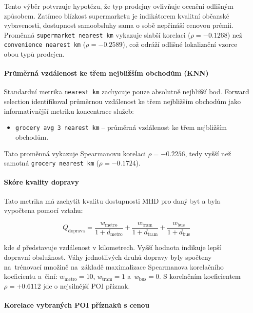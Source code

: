 Tento výběr potvrzuje hypotézu, že typ prodejny ovlivňuje ocenění odlišným způsobem. Zatímco blízkost supermarketu je indikátorem kvalitní občanské vybavenosti, dostupnost samoobsluhy sama o sobě nepřináší cenovou prémii. Proměnná \texttt{supermarket nearest km} vykazuje slabší korelaci (\(\rho = -0.1268\)) než \texttt{convenience nearest km} (\(\rho = -0.2589\)), což odráží odlišné lokalizační vzorce obou typů prodejen.

\paragraph{Průměrná vzdálenost ke třem nejbližším obchodům (KNN)}

Standardní metrika \texttt{nearest km} zachycuje pouze absolutně nejbližší bod. Forward selection identifikoval průměrnou vzdálenost ke třem nejbližším obchodům jako informativnější metriku koncentrace služeb:

\begin{itemize}
    \item \texttt{grocery avg 3 nearest km} -- průměrná vzdálenost ke třem nejbližším obchodům.
\end{itemize}

Tato proměnná vykazuje Spearmanovu korelaci \(\rho = -0.2256\), tedy vyšší než samotná \texttt{grocery nearest km} (\(\rho = -0.1724\)).

\paragraph{Skóre kvality dopravy}

Tato metrika má zachytit kvalitu dostupnosti MHD pro daný byt a byla vypočtena pomocí vztahu:

\begin{equation}
Q_{\text{doprava}} = \frac{w_{\text{metro}}}{1 + d_{\text{metro}}} + \frac{w_{\text{tram}}}{1 + d_{\text{tram}}} + \frac{w_{\text{bus}}}{1 + d_{\text{bus}}}
\end{equation}

kde \(d\) představuje vzdálenost v kilometrech. Vyšší hodnota indikuje lepší dopravní obslužnost. Váhy jednotlivých druhů dopravy byly spočteny na~trénovací množině na~základě maximalizace Spearmanova korelačního koeficientu a~činí: \(w_{\text{metro}} = 10\), \(w_{\text{tram}} = 1\) a~\(w_{\text{bus}} = 0\). S korelačním koeficientem \(\rho = +0.6112\) jde o nejsilnější POI příznak.
\paragraph{Korelace vybraných POI příznaků s cenou}

